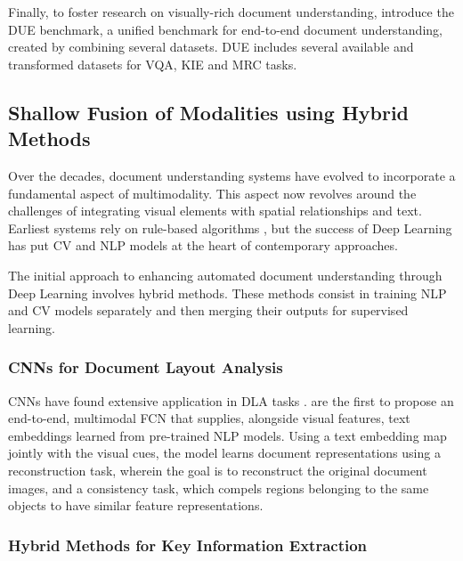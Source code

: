 Finally, to foster research on visually-rich document understanding, \citet{borchmann2021due} introduce the \ac{DUE} benchmark, a unified benchmark for end-to-end document understanding, created by combining several datasets. \ac{DUE} includes several available and transformed datasets for \ac{VQA}, \ac{KIE} and \ac{MRC} tasks.

\subsection{Shallow Fusion of Modalities using Hybrid Methods}
\label{subsection:chapter2-shallow-fusion}

Over the decades, document understanding systems have evolved to incorporate a fundamental aspect of multimodality. This aspect now revolves around the challenges of integrating visual elements with spatial relationships and text. Earliest systems rely on rule-based algorithms \citep{lebourgeois1992fast, amin2001page}, but the success of Deep Learning has put \ac{CV} and \ac{NLP} models at the heart of contemporary approaches.

The initial approach to enhancing automated document understanding through Deep Learning involves hybrid methods. These methods consist in training \ac{NLP} and \ac{CV} models separately and then merging their outputs for supervised learning. 

\subsubsection{CNNs for Document Layout Analysis} 

\acp{CNN} have found extensive application in \ac{DLA} tasks \citep{hao2016table, oliveira2018dhsegment, soto2019visual}. \citet{yang2017learning} are the first to propose an end-to-end, multimodal \ac{FCN} that supplies, alongside visual features, text embeddings learned from pre-trained \ac{NLP} models. Using a text embedding map jointly with the visual cues, the model learns document representations using a reconstruction task, wherein the goal is to reconstruct the original document images, and a consistency task, which compels regions belonging to the same objects to have similar feature representations. 

\subsubsection{Hybrid Methods for Key Information Extraction} 

